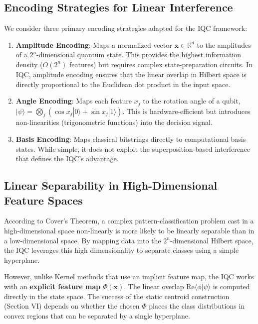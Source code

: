 \documentclass[conference]{IEEEtran}
\begin{document}
\subsection{Encoding Strategies for Linear Interference}

We consider three primary encoding strategies adapted for the IQC framework:
\begin{enumerate}
    \item \textbf{Amplitude Encoding}: Maps a normalized vector $\mathbf{x} \in \mathbb{R}^d$ to the amplitudes of a $2^n$-dimensional quantum state. This provides the highest information density ($O(2^n)$ features) but requires complex state-preparation circuits. In IQC, amplitude encoding ensures that the linear overlap in Hilbert space is directly proportional to the Euclidean dot product in the input space.
    \item \textbf{Angle Encoding}: Maps each feature $x_j$ to the rotation angle of a qubit, $|\psi\rangle = \bigotimes_j ( \cos x_j |0\rangle + \sin x_j |1\rangle)$. This is hardware-efficient but introduces non-linearities (trigonometric functions) into the decision signal.
    \item \textbf{Basis Encoding}: Maps classical bitstrings directly to computational basis states. While simple, it does not exploit the superposition-based interference that defines the IQC's advantage.
\end{enumerate}

\subsection{Linear Separability in High-Dimensional Feature Spaces}

According to Cover's Theorem, a complex pattern-class\-i\-fi\-ca\-tion problem cast in a high-dimensional space non-linearly is more likely to be linearly separable than in a low-dimensional space. By mapping data into the $2^n$-dimensional Hilbert space, the IQC leverages this high dimensionality to separate classes using a simple hyperplane. 

However, unlike Kernel methods that use an implicit feature map, the IQC works with an \textbf{explicit feature map} $\Phi(\mathbf{x})$. The linear overlap $\mathrm{Re}\langle \phi | \psi \rangle$ is computed directly in the state space. The success of the static centroid construction (Section VI) depends on whether the chosen $\Phi$ places the class distributions in convex regions that can be separated by a single hyperplane.
\end{document}
